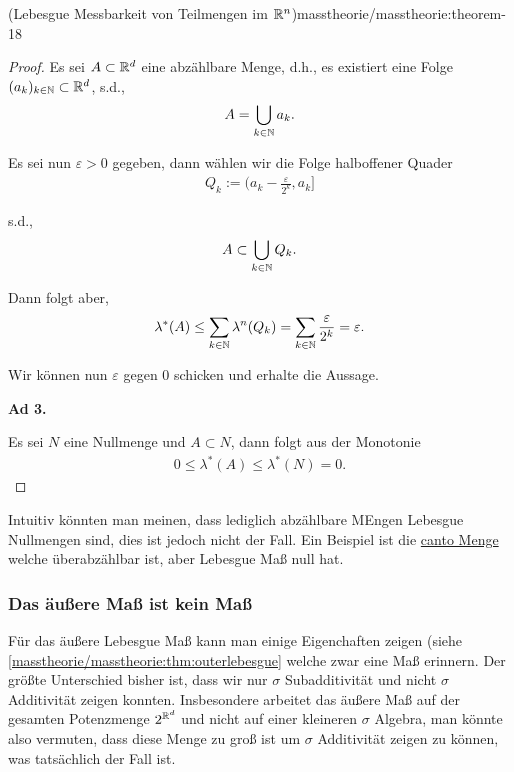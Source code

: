 \begin{theorem}{(Lebesgue Messbarkeit von Teilmengen im \protect\(\mathbb{R}^n\protect\))}{masstheorie/masstheorie:theorem-18}
\begin{proof}
\par
Es sei \(A\subset\mathbb{R}^d\) eine abzählbare Menge, d.h., es existiert eine Folge \((a_k)_{k\in\mathbb{N}}\subset\mathbb{R}^d\), s.d.,
\begin{align*}
A = \bigcup_{k\in\mathbb{N}} a_k.
\end{align*}
\par
Es sei nun \(\varepsilon>0\) gegeben, dann wählen wir die Folge halboffener Quader
\begin{align*}
Q_k := (a_k - \frac{\varepsilon}{2^k},a_k]
\end{align*}
\par
s.d.,
\begin{align*}
A\subset \bigcup_{k\in\mathbb{N}} Q_k.
\end{align*}
\par
Dann folgt aber,
\begin{align*}
\lambda^\ast(A) \leq \sum_{k\in\mathbb{N}} \lambda^n(Q_k) = \sum_{k\in\mathbb{N}} \frac{\varepsilon}{2^k} = \varepsilon.
\end{align*}
\par
Wir können nun \(\varepsilon\) gegen 0 schicken und erhalte die Aussage.

\par
\textbf{Ad 3.}

\par
Es sei \(N\) eine Nullmenge und \(A\subset N\), dann folgt aus der Monotonie
\begin{align*}
0\leq \lambda^\ast(A)\leq \lambda^\ast(N) = 0.
\end{align*}\end{proof}

\par
Intuitiv könnten man meinen, dass lediglich abzählbare MEngen Lebesgue Nullmengen sind, dies ist jedoch nicht der Fall. Ein Beispiel ist die \href{https://de.wikipedia.org/wiki/Cantor-Menge}{canto Menge} welche überabzählbar ist, aber Lebesgue Maß null hat.


\subsubsection{Das äußere Maß ist kein Maß}
\label{\detokenize{masstheorie/masstheorie:das-auszere-masz-ist-kein-masz}}
\par
Für das äußere Lebesgue Maß kann man einige Eigenchaften zeigen (siehe \cref{masstheorie/masstheorie:thm:outerlebesgue}  welche zwar eine Maß erinnern. Der größte Unterschied bisher ist, dass wir nur \(\sigma\) Subadditivität und nicht \(\sigma\) Additivität zeigen konnten. Insbesondere arbeitet das äußere Maß auf der gesamten Potenzmenge \(2^{\mathbb{R}^d}\) und nicht auf einer kleineren \(\sigma\) Algebra, man könnte also vermuten, dass diese Menge zu groß ist um \(\sigma\) Additivität zeigen zu können, was tatsächlich der Fall ist.


\end{theorem}
